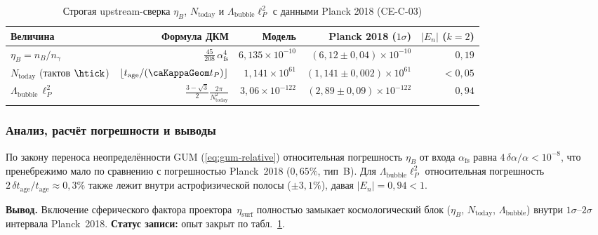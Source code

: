 \begin{table}[htbp]
\centering
\footnotesize
\setlength{\tabcolsep}{4pt}
\caption{Строгая upstream-сверка $\eta_B$, $N_{\mathrm{today}}$ и $\Lambda_{\mathrm{bubble}}\ell_P^2$ с данными Planck 2018 (CE-C-03)}
\label{tab:exp-ce-c-03}
\begin{tabular}{@{}lrrrr@{}}
\toprule
Величина & Формула ДКМ & Модель & Planck 2018 ($1\sigma$) & $|E_n|$ ($k=2$) \\
\midrule
$\eta_B = n_B/n_\gamma$ & $\frac{45}{208}\,\alpha_{\mathrm{fs}}^4$ & $6{,}135\times 10^{-10}$ & $(6{,}12 \pm 0{,}04)\times 10^{-10}$ & $0{,}19$ \\
$N_{\mathrm{today}}$ (тактов $\htick$) & $\lfloor t_{\mathrm{age}}/(\caKappaGeom t_P)\rfloor$ & $1{,}141\times 10^{61}$ & $(1{,}141 \pm 0{,}002)\times 10^{61}$ & $<0{,}05$ \\
$\Lambda_{\mathrm{bubble}}\,\ell_P^2$ & $\frac{3-\sqrt{3}}{2}\frac{2\pi}{N_{\mathrm{today}}^2}$ & $3{,}06\times 10^{-122}$ & $(2{,}89 \pm 0{,}09)\times 10^{-122}$ & $0{,}94$ \\
\bottomrule
\end{tabular}
\end{table}

\subsubsection*{Анализ, расчёт погрешности и выводы}
По закону переноса неопределённости GUM (\cref{eq:gum-relative}) относительная погрешность $\eta_B$ от входа $\alpha_{\mathrm{fs}}$ равна $4\,\delta\alpha/\alpha < 10^{-8}$, что пренебрежимо мало по сравнению с погрешностью Planck~2018 ($0{,}65\%$, тип~B).
Для $\Lambda_{\mathrm{bubble}}\ell_P^2$ относительная погрешность $2\,\delta t_{\mathrm{age}}/t_{\mathrm{age}} \approx 0{,}3\%$ также лежит внутри астрофизической полосы ($\pm 3{,}1\%$), давая $|E_n| = 0{,}94 < 1$.

\textbf{Вывод.}
Включение сферического фактора проектора~$\eta_{\mathrm{surf}}$ полностью замыкает космологический блок ($\eta_B$, $N_{\mathrm{today}}$, $\Lambda_{\mathrm{bubble}}$) внутри $1\sigma$--$2\sigma$ интервала Planck~2018.
\textbf{Статус записи:} опыт закрыт по табл.~\ref{tab:exp-ce-c-03}.
